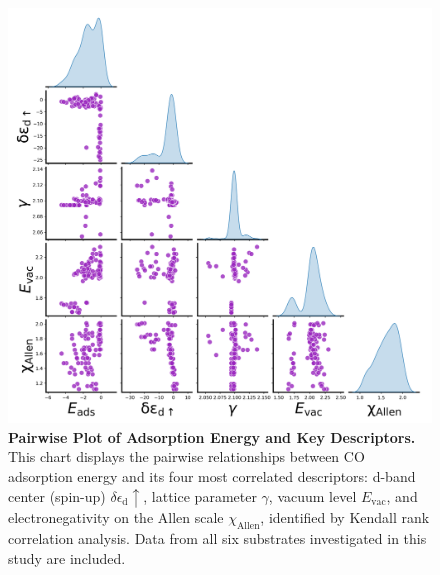 \documentclass[a4paper, 12pt]{article}
\begin{document}
\begin{figure}[htbp]
  \centering
  \includegraphics[width=\textwidth]{supp_fig19_pairwise_eads_des.png}
  \caption{\textbf{Pairwise Plot of Adsorption Energy and Key Descriptors.}
  This chart displays the pairwise relationships between CO adsorption energy and
  its four most correlated descriptors: d-band center (spin-up) $\delta\epsilon_{\text{d}}\uparrow$,
  lattice parameter $\gamma$, vacuum level $E_\text{vac}$, and electronegativity
  on the Allen scale $\chi_\text{Allen}$, identified by Kendall rank correlation analysis.
  Data from all six substrates investigated in this study are included.}
  \label{supp_fig19:pairwise_eads_des}
\end{figure}
\end{document}
